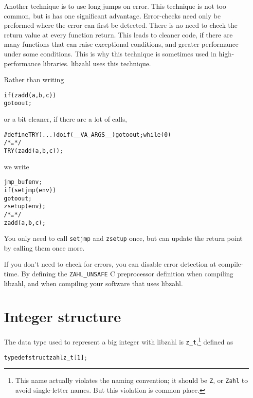 Another technique is to use long jumps on error.
This technique is not too common, but is has one
significant advantage. Error-checks need only be
preformed where the error can first be detected.
There is no need to check the return value at every
function return. This leads to cleaner code, if
there are many functions that can raise exceptional
conditions, and greater performance under some
conditions. This is why this technique is sometimes
used in high-performance libraries. libzahl uses
this technique.

Rather than writing

\begin{alltt}
   if (zadd(a, b, c))
       goto out;
\end{alltt}

\noindent
or a bit cleaner, if there are a lot of calls,

\begin{alltt}
   #define TRY(...) do if (__VA_ARGS__) goto out; while (0)
   \textcolor{c}{/* \textrm{\ldots} */}
   TRY(zadd(a, b, c));
\end{alltt}

\noindent
we write

\begin{alltt}
   jmp_buf env;
   if (setjmp(env))
       goto out;
   zsetup(env);
   \textcolor{c}{/* \textrm{\ldots} */}
   zadd(a, b, c);
\end{alltt}

You only need to call {\tt setjmp} and {\tt zsetup}
once, but can update the return point by calling
them once more.

If you don't need to check for errors, you can
disable error detection at compile-time. By defining
the {\tt ZAHL\_UNSAFE} C preprocessor definition
when compiling libzahl, and when compiling your
software that uses libzahl.


\newpage
\section{Integer structure}
\label{sec:Integer structure}

The data type used to represent a big integer with
libzahl is {\tt z\_t},\footnote{This name actually
violates the naming convention; it should be {\tt Z},
or {\tt Zahl} to avoid single-letter names. But this
violation is common place.} defined as

\begin{alltt}
   typedef struct zahl z_t[1];
\end{alltt}

